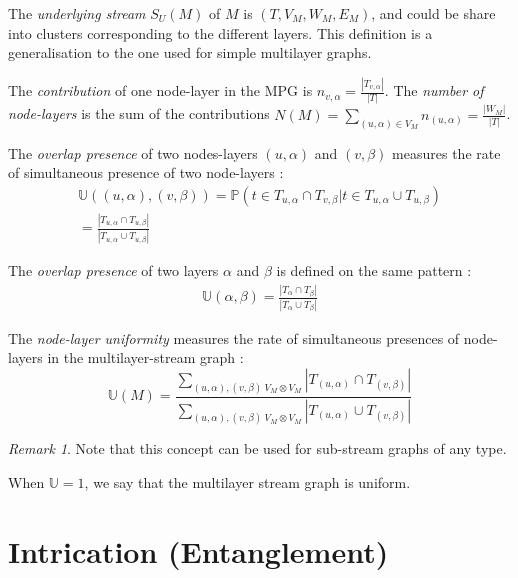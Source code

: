 \documentclass[dvipsnames,a4paper,11pt]{article}
\theoremstyle{definition}
\theoremstyle{remark}
\newtheorem{rmq}{Remark}
\begin{document}
    The {\em underlying stream } $S_U(M)$ of $M$ is $(T,V_M,W_M,E_M)$, and could be share into clusters corresponding to the different layers. This definition is a generalisation to the one used for simple multilayer graphs. 
    

    
    The {\em contribution} of one node-layer in the MPG is $n_{v,\alpha} = \frac{|T_{v,\alpha}|}{|T|}$. The {\em number of node-layers} is the sum of the contributions $N(M) = \underset{(u,\alpha)\in V_M}{\sum} n_{(u,\alpha)} = \frac{|W_M|}{|T|}$. 
    
	The {\em overlap presence } of two nodes-layers $(u,\alpha)$ and $(v,\beta)$ measures the rate of simultaneous presence of two node-layers :
	\begin{align*}
		\mathbb{U}((u,\alpha),(v,\beta))=\mathbb{P}( t \in T_{u,\alpha} \cap T_{v,\beta} | t \in T_{u,\alpha} \cup T_{u,\beta}) \\
		= \frac{|T_{u,\alpha}\cap T_{u,\beta}|}{|T_{u,\alpha}\cup T_{u,\beta}|}		
	\end{align*}
    
	The {\em overlap presence} of two layers $\alpha$ and $\beta$ is defined on the same pattern :  
	\begin{align*}
		\mathbb{U}(\alpha,\beta) = \frac{|T_{\alpha}\cap T_{\beta}|}{|T_{\alpha}\cup T_{\beta}|}
	\end{align*}	    
    
    The {\em node-layer uniformity} measures the rate of simultaneous presences of node-layers in the multilayer-stream graph :
    \[
    	\mathbb{U}(M) = \frac{\sum_{(u,\alpha),(v,\beta) \ V_M \otimes V_M}{|T_{(u,\alpha)} \cap T_{(v,\beta)}|}}{\sum_{(u,\alpha),(v,\beta) \ V_M \otimes V_M}{|T_{(u,\alpha)}\cup T_{(v,\beta)}|}}
    \]

	  
    
	\begin{rmq}
		Note that this concept can be used for sub-stream graphs of any type.
	\end{rmq}

	When $\mathbb{U}=1$, we say that the multilayer stream graph is uniform.
    
    	
    
      
    
    \section{Intrication (Entanglement)}
    	
\end{document}
